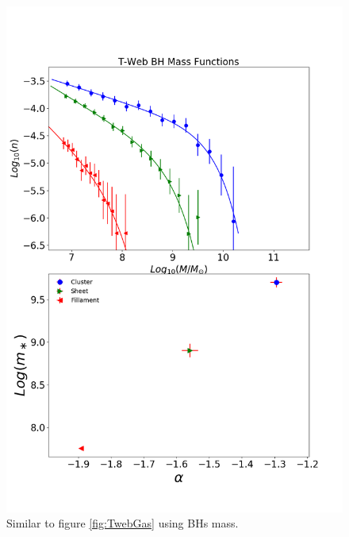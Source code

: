 \documentclass[a4paper,fleqn,usenatbib]{mnras}
\begin{document}
\begin{figure}
	\includegraphics[width=\columnwidth]{./pics/F19_T-Web_BH.png}
    \caption{Similar to figure \ref{fig:TwebGas} using BHs mass.} 
    \label{fig:TwebBH}
\end{figure}
\end{document}
